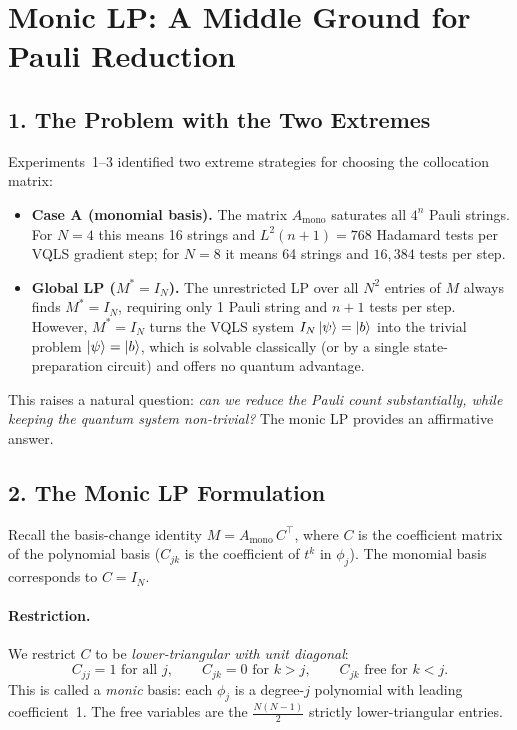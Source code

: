 \documentclass{article}
\begin{document}
\section*{Monic LP: A Middle Ground for Pauli Reduction}

\subsection*{1. The Problem with the Two Extremes}

Experiments~1--3 identified two extreme strategies for choosing the collocation
matrix:

\begin{itemize}
    \item \textbf{Case A (monomial basis).}  The matrix $A_{\mathrm{mono}}$ saturates
          all $4^n$ Pauli strings.  For $N=4$ this means 16 strings and
          $L^2(n+1) = 768$ Hadamard tests per VQLS gradient step; for $N=8$ it means
          64 strings and $16{,}384$ tests per step.

    \item \textbf{Global LP ($M^* = I_N$).}  The unrestricted LP over all $N^2$
          entries of $M$ always finds $M^* = I_N$, requiring only 1 Pauli string and
          $n+1$ tests per step.  However, $M^* = I_N$ turns the VQLS system
          $I_N\ket{\psi} = \ket{b}$ into the trivial problem $\ket{\psi} = \ket{b}$,
          which is solvable classically (or by a single state-preparation circuit) and
          offers no quantum advantage.
\end{itemize}

This raises a natural question: \emph{can we reduce the Pauli count substantially,
while keeping the quantum system non-trivial?}  The monic LP provides an affirmative
answer.

\subsection*{2. The Monic LP Formulation}

Recall the basis-change identity $M = A_{\mathrm{mono}}\,C^{\top}$, where $C$ is the
coefficient matrix of the polynomial basis ($C_{jk}$ is the coefficient of $t^k$ in
$\phi_j$).  The monomial basis corresponds to $C = I_N$.

\paragraph{Restriction.}
We restrict $C$ to be \emph{lower-triangular with unit diagonal}:
\begin{equation}
    C_{jj} = 1 \text{ for all } j,
    \qquad
    C_{jk} = 0 \text{ for } k > j,
    \qquad
    C_{jk} \text{ free for } k < j.
\end{equation}
This is called a \emph{monic} basis: each $\phi_j$ is a degree-$j$ polynomial with
leading coefficient~1.  The free variables are the $\tfrac{N(N-1)}{2}$ strictly
lower-triangular entries.
\end{document}
